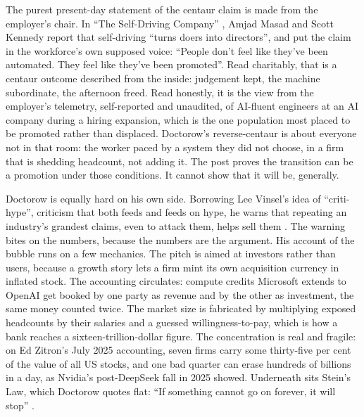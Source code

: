 The purest present-day statement of the centaur claim is made from the employer's chair. In ``The Self-Driving Company'' \parencite{MasadKennedy2026}, Amjad Masad and Scott Kennedy report that self-driving ``turns doers into directors'', and put the claim in the workforce's own supposed voice: ``People don't feel like they've been automated. They feel like they've been promoted''. Read charitably, that is a centaur outcome described from the inside: judgement kept, the machine subordinate, the afternoon freed. Read honestly, it is the view from the employer's telemetry, self-reported and unaudited, of AI-fluent engineers at an AI company during a hiring expansion, which is the one population most placed to be promoted rather than displaced. Doctorow's reverse-centaur is about everyone not in that room: the worker paced by a system they did not choose, in a firm that is shedding headcount, not adding it. The post proves the transition can be a promotion under those conditions. It cannot show that it will be, generally.

Doctorow is equally hard on his own side. Borrowing Lee Vinsel's idea of ``criti-hype'', criticism that both feeds and feeds on hype, he warns that repeating an industry's grandest claims, even to attack them, helps sell them \parencite{Vinsel2021}. The warning bites on the numbers, because the numbers are the argument. His account of the bubble runs on a few mechanics. The pitch is aimed at investors rather than users, because a growth story lets a firm mint its own acquisition currency in inflated stock. The accounting circulates: compute credits Microsoft extends to OpenAI get booked by one party as revenue and by the other as investment, the same money counted twice. The market size is fabricated by multiplying exposed headcounts by their salaries and a guessed willingness-to-pay, which is how a bank reaches a sixteen-trillion-dollar figure. The concentration is real and fragile: on Ed Zitron's July 2025 accounting, seven firms carry some thirty-five per cent of the value of all US stocks, and one bad quarter can erase hundreds of billions in a day, as Nvidia's post-DeepSeek fall in 2025 showed. Underneath sits Stein's Law, which Doctorow quotes flat: ``If something cannot go on forever, it will stop'' \parencite{Doctorow2026ReverseCentaur}.

